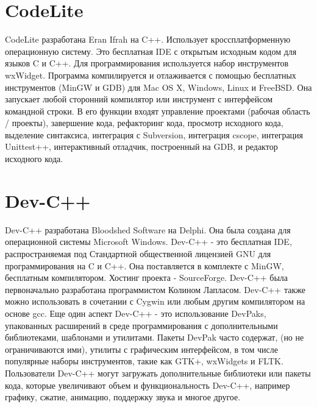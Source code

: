 \section{CodeLite}
CodeLite разработана Eran Ifrah на C++. Использует кроссплатформенную операционную систему. Это 
бесплатная IDE с открытым исходным кодом для языков C и C++. Для программирования используется 
набор инструментов wxWidget. Программа компилируется и отлаживается с помощью бесплатных 
инструментов (MinGW и GDB) для Mac OS X, Windows, Linux и FreeBSD. Она запускает любой сторонний 
компилятор или инструмент с интерфейсом командной строки. В его функции входят управление проектами
(рабочая область / проекты), завершение кода, рефакторинг кода, просмотр исходного кода, выделение
синтаксиса, интеграция с Subversion, интеграция cscope, интеграция Unittest++, интерактивный 
отладчик, построенный на GDB, и редактор исходного кода.\\

\section{Dev-C++}
Dev-C++ разработана Bloodshed Software на Delphi. Она была создана для операционной системы 
Microsoft Windows. Dev-C++ - это бесплатная IDE, распространяемая под Стандартной 
общественной лицензией GNU для программирования на C и C++. Она поставляется в комплекте с MinGW,
бесплатным компилятором. Хостинг проекта - SourceForge. Dev-C++ была первоначально разработана
программистом Колином Лапласом. Dev-C++ также можно использовать в сочетании с Cygwin или любым 
другим компилятором на основе gcc. Еще один аспект Dev-C++ - это использование DevPaks, упакованных
расширений в среде программирования с дополнительными библиотеками, шаблонами и утилитами. Пакеты 
DevPak часто содержат, (но не ограничиваются ими), утилиты с графическим интерфейсом, в том числе
популярные наборы инструментов, такие как GTK+, wxWidgets и FLTK. Пользователи Dev-C++ могут 
загружать дополнительные библиотеки или пакеты кода, которые увеличивают объем и функциональность 
Dev-C++, например графику, сжатие, анимацию, поддержку звука и многое другое.\\

